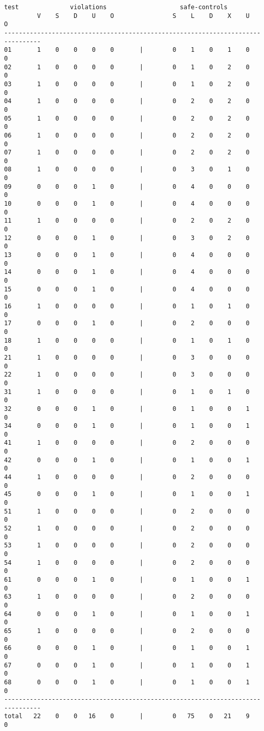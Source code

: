 \documentclass[11pt]{article}
\begin{document}
\begin{scriptsize}
\begin{verbatim}
test              violations                    safe-controls
         V    S    D    U    O                S    L    D    X    U    O
--------------------------------------------------------------------------------
01       1    0    0    0    0       |        0    1    0    1    0    0
02       1    0    0    0    0       |        0    1    0    2    0    0
03       1    0    0    0    0       |        0    1    0    2    0    0
04       1    0    0    0    0       |        0    2    0    2    0    0
05       1    0    0    0    0       |        0    2    0    2    0    0
06       1    0    0    0    0       |        0    2    0    2    0    0
07       1    0    0    0    0       |        0    2    0    2    0    0
08       1    0    0    0    0       |        0    3    0    1    0    0
09       0    0    0    1    0       |        0    4    0    0    0    0
10       0    0    0    1    0       |        0    4    0    0    0    0
11       1    0    0    0    0       |        0    2    0    2    0    0
12       0    0    0    1    0       |        0    3    0    2    0    0
13       0    0    0    1    0       |        0    4    0    0    0    0
14       0    0    0    1    0       |        0    4    0    0    0    0
15       0    0    0    1    0       |        0    4    0    0    0    0
16       1    0    0    0    0       |        0    1    0    1    0    0
17       0    0    0    1    0       |        0    2    0    0    0    0
18       1    0    0    0    0       |        0    1    0    1    0    0
21       1    0    0    0    0       |        0    3    0    0    0    0
22       1    0    0    0    0       |        0    3    0    0    0    0
31       1    0    0    0    0       |        0    1    0    1    0    0
32       0    0    0    1    0       |        0    1    0    0    1    0
34       0    0    0    1    0       |        0    1    0    0    1    0
41       1    0    0    0    0       |        0    2    0    0    0    0
42       0    0    0    1    0       |        0    1    0    0    1    0
44       1    0    0    0    0       |        0    2    0    0    0    0
45       0    0    0    1    0       |        0    1    0    0    1    0
51       1    0    0    0    0       |        0    2    0    0    0    0
52       1    0    0    0    0       |        0    2    0    0    0    0
53       1    0    0    0    0       |        0    2    0    0    0    0
54       1    0    0    0    0       |        0    2    0    0    0    0
61       0    0    0    1    0       |        0    1    0    0    1    0
63       1    0    0    0    0       |        0    2    0    0    0    0
64       0    0    0    1    0       |        0    1    0    0    1    0
65       1    0    0    0    0       |        0    2    0    0    0    0
66       0    0    0    1    0       |        0    1    0    0    1    0
67       0    0    0    1    0       |        0    1    0    0    1    0
68       0    0    0    1    0       |        0    1    0    0    1    0
--------------------------------------------------------------------------------
total   22    0    0   16    0       |        0   75    0   21    9    0
\end{verbatim}
\end{scriptsize}
\end{document}
